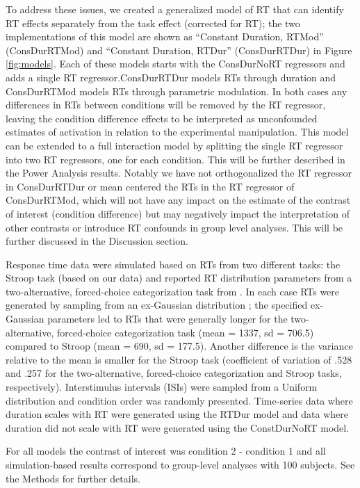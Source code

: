 \documentclass[sn-mathphys,Numbered, super, referee, lineno]{sn-jnl}
\begin{document}
To address these issues, we created a generalized model of RT that can identify RT effects separately from the task effect (corrected for RT); the two implementations of this model are shown as ``Constant Duration, RTMod'' (ConsDurRTMod) and ``Constant Duration, RTDur'' (ConsDurRTDur) in Figure \ref{fig:models}.  Each of these models starts with the ConsDurNoRT regressors and adds a single RT regressor.ConsDurRTDur models RTs through duration and ConsDurRTMod models RTs through parametric modulation. In both cases any differences in RTs between conditions will be removed by the RT regressor, leaving the condition difference effects to be interpreted as unconfounded estimates of activation in relation to the experimental manipulation. This model can be extended to a full interaction model by splitting the single RT regressor into two RT regressors, one for each condition.   This will be further described in the Power Analysis results. Notably we have not orthogonalized the RT regressor in ConsDurRTDur or mean centered the RTs in the RT regressor of ConsDurRTMod, which will not have any impact on the estimate of the contrast of interest (condition difference) but may negatively impact the interpretation of other contrasts or introduce RT confounds in group level analyses.  This will be further discussed in the Discussion section.    

Response time data were simulated based on RTs from two different tasks: the Stroop task (based on our data) and reported RT distribution parameters from a two-alternative, forced-choice categorization task from \citet{grinband_detection_2008}.  In each case RTs were generated by sampling from an ex-Gaussian distribution \citep{Ratcliff1976RetrievalPI}; the specified ex-Gaussian parameters led to RTs that were generally longer for the two-alternative, forced-choice categorization task (mean = 1337, sd = 706.5) compared to Stroop (mean = 690, sd = 177.5).  Another difference is the variance relative to the mean is smaller for the Stroop task (coefficient of variation of .528 and .257 for the two-alternative, forced-choice categorization and Stroop tasks, respectively).   Interstimulus intervals (ISIs) were sampled from a Uniform distribution and condition order was randomly presented.  Time-series data where duration scales with RT were generated using the RTDur model and data where duration did not scale with RT were generated using the ConstDurNoRT model. 

For all models the contrast of interest was condition 2 - condition 1 and all simulation-based results correspond to group-level analyses with 100 subjects.  See the Methods for further details.
\end{document}
